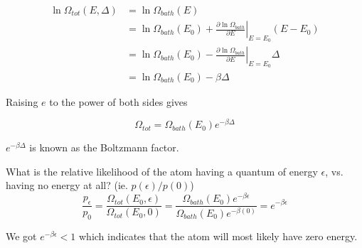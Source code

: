 \begin{align*}
	\ln\Omega_{tot}(E,\Delta)&=\ln\Omega_{bath}(E) \\
	&=\ln\Omega_{bath}(E_0)+\left.\frac{\partial \ln\Omega_{bath}}{\partial E}\right\vert_{E=E_0}(E-E_0) \\
	&=\ln\Omega_{bath}(E_0)-\left.\frac{\partial \ln\Omega_{bath}}{\partial E}\right\vert_{E=E_0}\Delta \\
	&=\ln\Omega_{bath}(E_0)-\beta\Delta
\end{align*}

Raising $e$ to the power of both sides gives

$$\boxed{\Omega_{tot}=\Omega_{bath}(E_0)e^{-\beta\Delta}}$$

$e^{-\beta\Delta}$ is known as the Boltzmann factor.

\begin{texample}
	What is the relative likelihood of the atom having a quantum of energy $\epsilon$, vs. having no energy at all? (ie. $p(\epsilon)/p(0)$) \\
	
	$$\frac{p_\epsilon}{p_0}=\frac{\Omega_{tot}(E_0,\epsilon)}{\Omega_{tot}(E_0,0)}=\frac{\Omega_{bath}(E_0)e^{-\beta\epsilon}}{\Omega_{bath}(E_0)e^{-\beta(0)}}=e^{-\beta\epsilon}$$
	
	We got $e^{-\beta\epsilon}<1$ which indicates that the atom will most likely have zero energy.
\end{texample}

